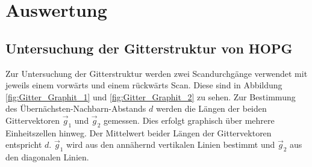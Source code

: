 \section{Auswertung}
\label{sec:Auswertung}
\subsection{Untersuchung der Gitterstruktur von HOPG}
Zur Untersuchung der Gitterstruktur werden zwei Scandurchgänge verwendet mit jeweils einem vorwärts und einem rückwärts Scan. Diese sind in Abbildung \ref{fig:Gitter_Graphit_1} und \ref{fig:Gitter_Graphit_2} zu sehen. Zur Bestimmung des Übernächsten-Nachbarn-Abstands $d$ werden die Längen der beiden Gittervektoren $\vec{g}_1$ und $\vec{g}_2$ gemessen. Dies erfolgt graphisch über mehrere Einheitszellen hinweg. Der Mittelwert beider Längen der Gittervektoren entspricht $d$. $\vec{g}_1$ wird aus den annähernd vertikalen Linien bestimmt und $\vec{g}_2$ aus den diagonalen Linien. 
